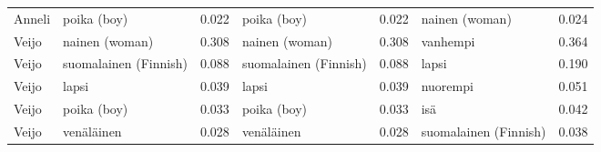\begin{longtable}{llrlrlr}
Anneli &               poika (boy) &                            0.022 &               poika (boy) &                                 0.022 &        nainen (woman) &                           0.024 \\
 Veijo &            nainen (woman) &                            0.308 &            nainen (woman) &                                 0.308 &              vanhempi &                           0.364 \\
 Veijo &     suomalainen (Finnish) &                            0.088 &     suomalainen (Finnish) &                                 0.088 &                 lapsi &                           0.190 \\
 Veijo &                     lapsi &                            0.039 &                     lapsi &                                 0.039 &              nuorempi &                           0.051 \\
 Veijo &               poika (boy) &                            0.033 &               poika (boy) &                                 0.033 &                   isä &                           0.042 \\
 Veijo &                venäläinen &                            0.028 &                venäläinen &                                 0.028 & suomalainen (Finnish) &                           0.038 \\
\end{longtable}
